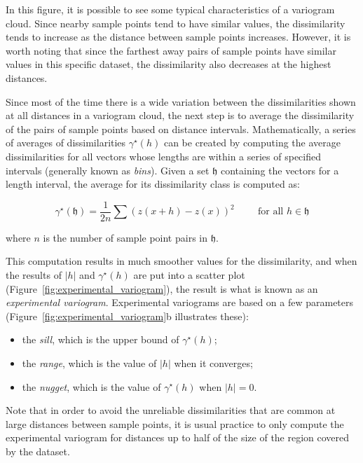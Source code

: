 In this figure, it is possible to see some typical characteristics of a variogram cloud.
Since nearby sample points tend to have similar values, the dissimilarity tends to increase as the distance between sample points increases.
However, it is worth noting that since the farthest away pairs of sample points have similar values in this specific dataset, the dissimilarity also decreases at the highest distances.

Since most of the time there is a wide variation between the dissimilarities shown at all distances in a variogram cloud, the next step is to average the dissimilarity of the pairs of sample points based on distance intervals.
Mathematically, a series of averages of dissimilarities \(\gamma^\star(h)\) can be created by computing the average dissimilarities for all vectors whose lengths are within a series of specified intervals (generally known as \emph{bins}).
Given a set \(\mathfrak{h}\) containing the vectors for a length interval, the average for its dissimilarity class is computed as:

\begin{equation}
\gamma^\star(\mathfrak{h}) = \frac{1}{2n}\sum\left(z\left(x+h\right)-z\left(x\right)\right)^2 \hspace{1cm}\text{for all } h \in \mathfrak{h}
\end{equation}

where \(n\) is the number of sample point pairs in \(\mathfrak{h}\).

This computation results in much smoother values for the dissimilarity, and when the results of \(|h|\) and \(\gamma^\star(h)\) are put into a scatter plot (Figure~\ref{fig:experimental_variogram}), the result is what is known as an \emph{experimental variogram}.
Experimental variograms are based on a few parameters (Figure~\ref{fig:experimental_variogram}b illustrates these): 
\begin{itemize}
  \item the \emph{sill}, which is the upper bound of \(\gamma^\star(h)\);
  \item the \emph{range}, which is the value of \(|h|\) when it converges; 
  \item the \emph{nugget}, which is the value of \(\gamma^\star(h)\) when \(|h| = 0\).
\end{itemize}
Note that in order to avoid the unreliable dissimilarities that are common at large distances between sample points, it is usual practice to only compute the experimental variogram for distances up to half of the size of the region covered by the dataset.

